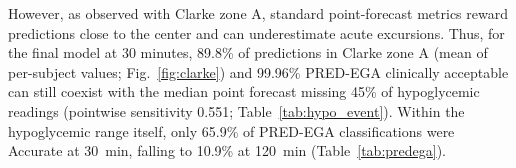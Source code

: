 \documentclass[journal]{IEEEtran}
\begin{document}
However, as observed with Clarke zone A, standard point-forecast metrics reward predictions close to the center and can underestimate acute excursions. Thus, for the final model at 30 minutes, 89.8\% of predictions in Clarke zone A (mean of per-subject values; Fig.~\ref{fig:clarke}) and 99.96\% PRED-EGA clinically acceptable can still coexist with the median point forecast missing 45\% of hypoglycemic readings (pointwise sensitivity 0.551; Table~\ref{tab:hypo_event}). Within the hypoglycemic range itself, only 65.9\% of PRED-EGA classifications were Accurate at 30~min, falling to 10.9\% at 120~min (Table~\ref{tab:predega}).

\summarytable
{}\of\summarytable \global\let\ClAa=\pgfplotsretval
{}\of\summarytable \global\let\ClAb=\pgfplotsretval
{}\of\summarytable \global\let\ClAc=\pgfplotsretval
{}\of\summarytable \global\let\ClAd=\pgfplotsretval
{}\of\summarytable \global\let\ClBa=\pgfplotsretval
{}\of\summarytable \global\let\ClBb=\pgfplotsretval
{}\of\summarytable \global\let\ClBc=\pgfplotsretval
{}\of\summarytable \global\let\ClBd=\pgfplotsretval
{}\of\summarytable \global\let\ClCa=\pgfplotsretval
{}\of\summarytable \global\let\ClCb=\pgfplotsretval
{}\of\summarytable \global\let\ClCc=\pgfplotsretval
{}\of\summarytable \global\let\ClCd=\pgfplotsretval
{}\of\summarytable \global\let\ClDa=\pgfplotsretval
{}\of\summarytable \global\let\ClDb=\pgfplotsretval
{}\of\summarytable \global\let\ClDc=\pgfplotsretval
{}\of\summarytable \global\let\ClDd=\pgfplotsretval
{}\of\summarytable \global\let\ClEa=\pgfplotsretval
{}\of\summarytable \global\let\ClEb=\pgfplotsretval
{}\of\summarytable \global\let\ClEc=\pgfplotsretval
{}\of\summarytable \global\let\ClEd=\pgfplotsretval
\end{document}
